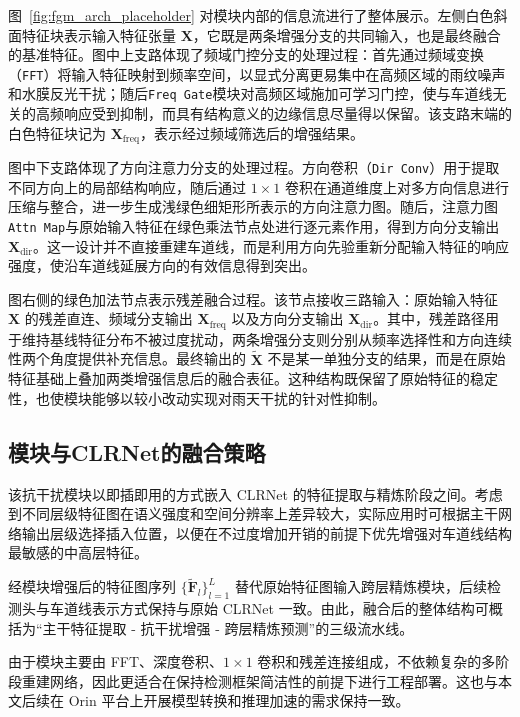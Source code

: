 图~\ref{fig:fgm_arch_placeholder} 对模块内部的信息流进行了整体展示。左侧白色斜面特征块表示输入特征张量 $\mathbf{X}$，它既是两条增强分支的共同输入，也是最终融合的基准特征。图中上支路体现了频域门控分支的处理过程：首先通过频域变换（\texttt{FFT}）将输入特征映射到频率空间，以显式分离更易集中在高频区域的雨纹噪声和水膜反光干扰；随后\texttt{Freq Gate}模块对高频区域施加可学习门控，使与车道线无关的高频响应受到抑制，而具有结构意义的边缘信息尽量得以保留。该支路末端的白色特征块记为 $\mathbf{X}_{\text{freq}}$，表示经过频域筛选后的增强结果。

图中下支路体现了方向注意力分支的处理过程。方向卷积（\texttt{Dir Conv}）用于提取不同方向上的局部结构响应，随后通过 $1\times1$ 卷积在通道维度上对多方向信息进行压缩与整合，进一步生成浅绿色细矩形所表示的方向注意力图。随后，注意力图\texttt{Attn Map}与原始输入特征在绿色乘法节点处进行逐元素作用，得到方向分支输出 $\mathbf{X}_{\text{dir}}$。这一设计并不直接重建车道线，而是利用方向先验重新分配输入特征的响应强度，使沿车道线延展方向的有效信息得到突出。

图右侧的绿色加法节点表示残差融合过程。该节点接收三路输入：原始输入特征 $\mathbf{X}$ 的残差直连、频域分支输出 $\mathbf{X}_{\text{freq}}$ 以及方向分支输出 $\mathbf{X}_{\text{dir}}$。其中，残差路径用于维持基线特征分布不被过度扰动，两条增强分支则分别从频率选择性和方向连续性两个角度提供补充信息。最终输出的 $\tilde{\mathbf{X}}$ 不是某一单独分支的结果，而是在原始特征基础上叠加两类增强信息后的融合表征。这种结构既保留了原始特征的稳定性，也使模块能够以较小改动实现对雨天干扰的针对性抑制。

\subsection{模块与CLRNet的融合策略}

该抗干扰模块以即插即用的方式嵌入 CLRNet 的特征提取与精炼阶段之间。考虑到不同层级特征图在语义强度和空间分辨率上差异较大，实际应用时可根据主干网络输出层级选择插入位置，以便在不过度增加开销的前提下优先增强对车道线结构最敏感的中高层特征。

经模块增强后的特征图序列 $\{\tilde{\mathbf{F}}_l\}_{l=1}^L$ 替代原始特征图输入跨层精炼模块，后续检测头与车道线表示方式保持与原始 CLRNet 一致。由此，融合后的整体结构可概括为“主干特征提取 - 抗干扰增强 - 跨层精炼预测”的三级流水线。

由于模块主要由 FFT、深度卷积、$1\times1$ 卷积和残差连接组成，不依赖复杂的多阶段重建网络，因此更适合在保持检测框架简洁性的前提下进行工程部署。这也与本文后续在 Orin 平台上开展模型转换和推理加速的需求保持一致。

